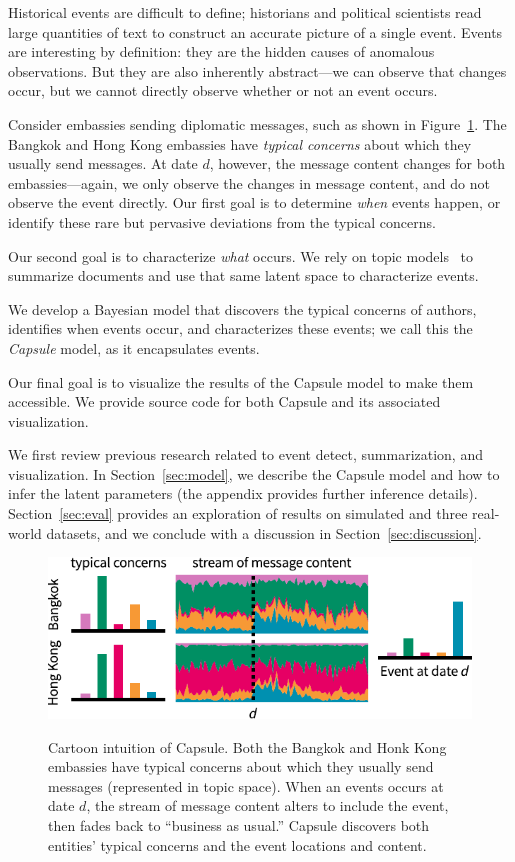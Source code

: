 
Historical events are difficult to define; historians and political scientists read large quantities of text to construct an accurate picture of a single event.  Events are interesting by definition: they are the hidden causes of anomalous observations.  But they are also inherently abstract---we can observe that changes occur, but we cannot directly observe whether or not an event occurs.

Consider embassies sending diplomatic messages, such as shown in Figure~\ref{fig:cartoon}.  The Bangkok and Hong Kong embassies have \emph{typical concerns} about which they usually send messages.  At date $d$, however, the message content changes for both embassies---again, we only observe the changes in message content, and do not observe the event directly.  Our first goal is to determine \emph{when} events happen, or identify these rare but pervasive deviations from the typical concerns.

Our second goal is to characterize \emph{what} occurs.  We rely on topic models~\cite{Blei:2012} to summarize documents and use that same latent space to characterize events.

We develop a Bayesian model that discovers the typical concerns of authors, identifies when events occur, and characterizes these events; we call this the \emph{Capsule} model, as it encapsulates events.

Our final goal is to visualize the results of the Capsule model to make them accessible.   We provide source code for both Capsule and its associated visualization.

We first review previous research related to event detect, summarization, and visualization.  In Section~\ref{sec:model}, we describe the Capsule model and how to infer the latent parameters (the appendix provides further inference details).  Section~\ref{sec:eval} provides an exploration of results on simulated and three real-world datasets, and we conclude with a discussion in Section~\ref{sec:discussion}.


\begin{figure}
\centering
\includegraphics[width=\linewidth]{fig/cartoon.pdf}
\label{fig:cartoon}
\vskip -12pt
\caption{Cartoon intuition of Capsule.  Both the Bangkok and Honk Kong embassies have typical concerns about which they usually send messages (represented in topic space).  When an events occurs at date $d$, the stream of message content alters to include the event, then fades back to ``business as usual.''  Capsule discovers both entities' typical concerns and the event locations and content.}
\end{figure}

